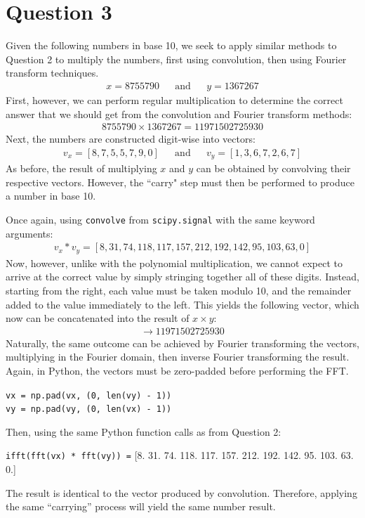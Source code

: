 \documentclass[a4paper, 11pt]{article}
\begin{document}
\newpage
\section*{Question 3}

Given the following numbers in base 10, we seek to apply similar methods to
Question 2 to multiply the numbers, first using convolution, then using Fourier
transform techniques.
\begin{align*}
    x = 8755790 && \text{and} && y = 1367267
\end{align*}
First, however, we can perform regular multiplication to determine the correct
answer that we should get from the convolution and Fourier transform methods:
\begin{align*}
    8755790 \times 1367267 = 11971502725930
\end{align*}
Next, the numbers are constructed digit-wise into vectors:
\begin{align*}
    v_x = [8, 7, 5, 5, 7, 9, 0] && \text{and} && v_y = [1, 3, 6, 7, 2, 6, 7]
\end{align*}
As before, the result of multiplying $x$ and $y$ can be obtained by convolving
their respective vectors. However, the ``carry" step must then be performed to
produce a number in base 10.

Once again, using \texttt{convolve} from \texttt{scipy.signal} with the same
keyword arguments:
\begin{align*}
    v_x \ast v_y = [8, 31, 74, 118, 117, 157, 212, 192, 142, 95, 103, 63, 0]
\end{align*}
Now, however, unlike with the polynomial multiplication, we cannot expect to
arrive at the correct value by simply stringing together all of these digits.
Instead, starting from the right, each value must be taken modulo 10, and the
remainder added to the value immediately to the left. This yields the following
vector, which now can be concatenated into the result of $x \times y$:
\begin{align*}
    [1, 1, 9, 7, 1, 5, 0, 2, 7, 2, 5, 9, 3, 0] \longrightarrow 11971502725930
\end{align*}
Naturally, the same outcome can be achieved by Fourier transforming the vectors,
multiplying in the Fourier domain, then inverse Fourier transforming the result.
Again, in Python, the vectors must be zero-padded before performing the FFT.
\begin{center}
    \texttt{vx = np.pad(vx, (0, len(vy) - 1))} \\
    \texttt{vy = np.pad(vy, (0, len(vx) - 1))}
\end{center}
Then, using the same Python function calls as from Question 2:
\begin{center}
    \texttt{ifft(fft(vx) * fft(vy)) =}
        [8.  31.  74. 118. 117. 157. 212. 192. 142.  95. 103.  63.   0.]
\end{center}
The result is identical to the vector produced by convolution. Therefore,
applying the same ``carrying'' process will yield the same number result.
\end{document}

